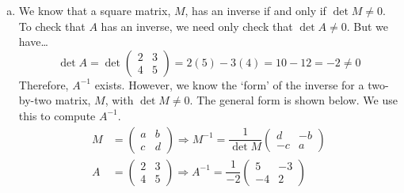 \documentclass[12pt,letterpaper]{exam}
\begin{document}
\begin{questions}
\begin{enumerate}[(a)]
\item We know that a square matrix, $M$, has an inverse if and only if $\det M \neq 0$. To check that $A$ has an inverse, we need only check that $\det A \neq 0$. But we have\dots
	\[
	\det A= \det \begin{pmatrix} 2 & 3 \\ 4 & 5 \end{pmatrix}= 2(5) - 3(4)= 10 - 12= -2 \neq 0
	\]
Therefore, $A^{-1}$ exists. However, we know the `form' of the inverse for a two-by-two matrix, $M$, with $\det M \neq 0$. The general form is shown below. We use this to compute $A^{-1}$. 
	\[
	\begin{aligned}
	M&= \begin{pmatrix} a & b \\ c & d \end{pmatrix} \Longrightarrow M^{-1}= \dfrac{1}{\det M} \begin{pmatrix} d & -b \\ -c & a \end{pmatrix} \\[0.3cm]
	A&= \begin{pmatrix} 2 & 3 \\ 4 & 5 \end{pmatrix} \Longrightarrow A^{-1}= \dfrac{1}{-2} \begin{pmatrix} 5 & -3 \\ -4 & 2 \end{pmatrix}
	\end{aligned}
	\] \par\vspace{0.3cm}


\end{enumerate}
\end{questions}
\end{document}
